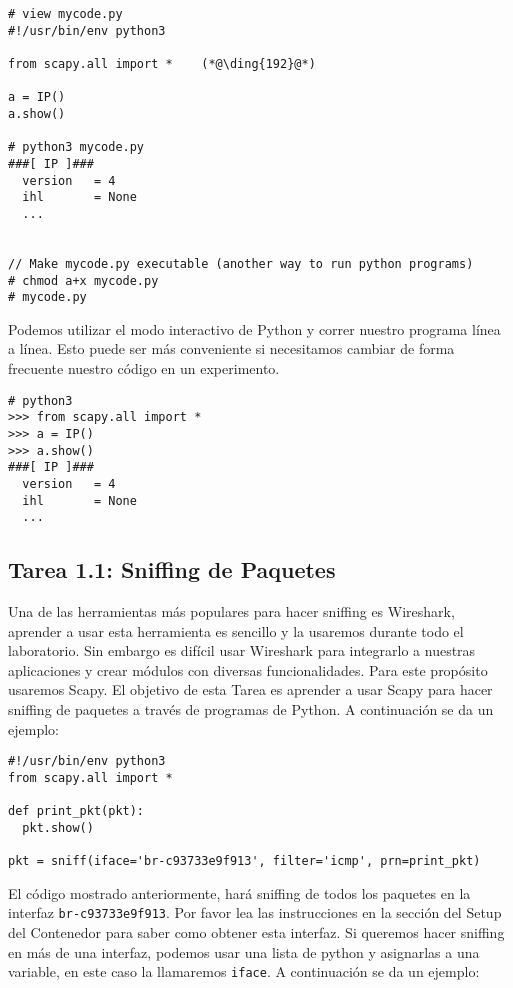 \begin{lstlisting}
# view mycode.py
#!/usr/bin/env python3

from scapy.all import *    (*@\ding{192}@*)

a = IP()
a.show()

# python3 mycode.py
###[ IP ]###
  version   = 4
  ihl       = None
  ...


// Make mycode.py executable (another way to run python programs)
# chmod a+x mycode.py
# mycode.py 
\end{lstlisting}

Podemos utilizar el modo interactivo de Python y correr nuestro programa línea a línea. Esto puede ser más conveniente si necesitamos cambiar de forma frecuente nuestro código en un experimento.


\begin{lstlisting}
# python3
>>> from scapy.all import *
>>> a = IP()
>>> a.show()
###[ IP ]###
  version   = 4
  ihl       = None
  ...
\end{lstlisting}
 

\subsection{Tarea 1.1: Sniffing de Paquetes}  

Una de las herramientas más populares para hacer sniffing es Wireshark, aprender a usar esta herramienta es sencillo y la usaremos durante todo el laboratorio. Sin embargo es difícil usar Wireshark para integrarlo a nuestras aplicaciones y crear módulos con diversas funcionalidades. Para este propósito usaremos Scapy. El objetivo de esta Tarea es aprender a usar Scapy para hacer sniffing de paquetes a través de programas de Python.
A continuación se da un ejemplo:


\begin{lstlisting}
#!/usr/bin/env python3
from scapy.all import *

def print_pkt(pkt):
  pkt.show()

pkt = sniff(iface='br-c93733e9f913', filter='icmp', prn=print_pkt)
\end{lstlisting}

El código mostrado anteriormente, hará sniffing de todos los paquetes en la interfaz \texttt{br-c93733e9f913}. Por favor lea las instrucciones en la sección del Setup del Contenedor para saber como obtener esta interfaz.
Si queremos hacer sniffing en más de una interfaz, podemos usar una lista de python y asignarlas a una variable, en este caso la llamaremos \texttt{iface}.
A continuación se da un ejemplo:

